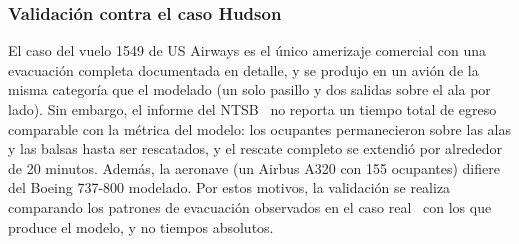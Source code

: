 \documentclass[a4paper, 11pt]{article}
\newif\ifmostraravisos
\newcommand{\pendiente}{%
  \ifmostraravisos
    \par\medskip\noindent
    \colorbox{yellow}{\parbox{\dimexpr\linewidth-2\fboxsep\relax}{\small\textbf{[ESTOS DATOS SON ANTES DE TERMINAR EL PROYECTO, UNA VEZ TERMINADO VOLVER A ESCRIBIR ESTA CONCLUSIÓN/FOTO]}}}%
    \par\medskip
  \fi}
\begin{document}
\subsubsection{Validaci\'on contra el caso Hudson}\label{sub:hudson}

El caso del vuelo 1549 de US Airways es el \'unico amerizaje comercial con una
evacuaci\'on completa documentada en detalle, y se produjo en un avi\'on de la misma
categor\'ia que el modelado (un solo pasillo y dos salidas sobre el ala por lado).
Sin embargo, el informe del NTSB~\cite{ntsb2010} no reporta un tiempo total de
egreso comparable con la m\'etrica del modelo: los ocupantes permanecieron sobre las
alas y las balsas hasta ser rescatados, y el rescate completo se extendi\'o por
alrededor de 20 minutos. Adem\'as, la aeronave (un Airbus A320 con 155 ocupantes)
difiere del Boeing 737-800 modelado. Por estos motivos, la validaci\'on se realiza
comparando los patrones de evacuaci\'on observados en el caso real~\cite{ntsb2010,
fsf_hudson} con los que produce el modelo, y no tiempos absolutos.

\pendiente
\end{document}
